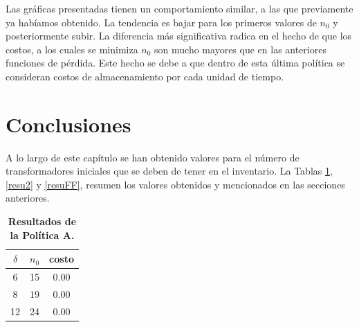 %
%
\noindent Las gr\'aficas presentadas tienen un comportamiento similar, a las que previamente ya hab\'iamos obtenido. La tendencia es bajar para los primeros valores de $n_0$ y posteriormente subir. La diferencia m\'as significativa radica en  el hecho de que los costos, a los cuales se minimiza $n_0$ son mucho mayores que en las anteriores funciones de p\'erdida. Este hecho se debe a que dentro de esta \'ultima pol\'itica se consideran costos de almacenamiento por cada unidad de tiempo.

\section{Conclusiones}
\noindent A lo largo de este cap\'itulo se han obtenido valores  para el n\'umero de transformadores iniciales que se deben de tener en el inventario. La Tablas  \ref{taba1},\ref{resu2} y \ref{resuFF},  resumen los valores obtenidos y mencionados en las secciones anteriores.
\begin{table}[h!]\small
\begin{center}
\caption{\bf Resultados de la Pol\'itica A.}\label{taba1}
\vspace{0.3cm}\begin{tabular}{ccc}
\toprule[0.6mm]
  $\delta$ & $n_0$ & costo\\
\toprule[0.6mm]
  6 & 15 &0.00\\
  8&19& 0.00\\
  12&24 & 0.00\\
\toprule[0.6mm]
\end{tabular}
\end{center}
\end{table}

